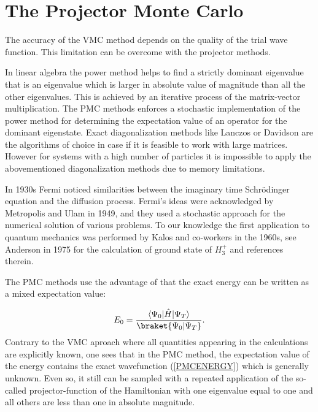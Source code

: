 \documentclass[twoside,english]{uiofysmaster}
\begin{document}
\section{The Projector Monte Carlo}\label{PMC}

The accuracy of the VMC method depends on the quality of the trial
wave function. This limitation can be overcome with the projector
methods.


In linear algebra the power method helps to find a strictly dominant
eigenvalue that is an eigenvalue which is larger in absolute value of
magnitude than all the other eigenvalues. This is achieved by an
iterative process of the matrix-vector
multiplication\cite{LayLinearAlgebraIts2015}.  The PMC methods enforces a 
stochastic implementation of the power method for determining the
expectation value of an operator for the dominant eigenstate. Exact
diagonalization methods like Lanczos or Davidson are the algorithms of
choice in case if it is feasible to work with large matrices. However for
systems with a high number of particles it is impossible to apply
the abovementioned diagonalization methods due to memory limitations.

In 1930s Fermi noticed similarities between the imaginary time
Schr\"{o}dinger equation and the diffusion process. Fermi's ideas were
acknowledged by Metropolis and Ulam in 1949, and they used a stochastic
approach for the numerical solution of various problems. To our
knowledge the first application to quantum mechanics was performed by
Kalos and co-workers in the 1960s, see Anderson \cite{Andersonrandomwalksimulation1975} in 1975 for the
calculation of ground state of $H_3^+$ and references therein.


The PMC methods use the advantage of that the exact energy can be written as a mixed expectation value:

\begin{equation}\label{PMCENERGY}
E_0 = \frac{\langle\Psi_0|\hat{H}|\Psi_T\rangle}{\braket{\Psi_0|\Psi_T}}.
\end{equation}
Contrary to the VMC aproach where all quantities appearing in the
calculations are explicitly known, one sees that in the PMC method, the
expectation value of the energy contains the exact wavefunction
(\ref{PMCENERGY}) which is generally unknown. Even so, it still can be
sampled with a repeated application of the so-called projector-function of the Hamiltonian with one eigenvalue equal to one and
all others are less than one in absolute magnitude.
\end{document}
